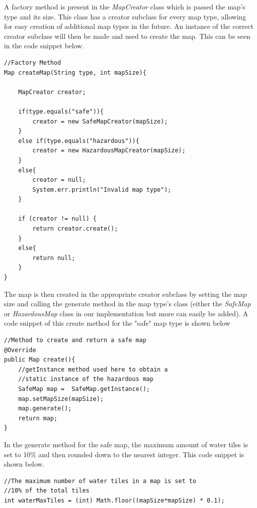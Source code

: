 \documentclass[a4paper,12pt]{extarticle}
\begin{document}
A factory method is present in the \textit{MapCreator} class which is passed the map's type and its size. This class has a creator subclass for every map type, allowing for easy creation of additional map types in the future. An instance of the correct creator subclass will then be made and used to create the map. This can be seen in the code snippet below.

\vspace{-1mm}
\begin{lstlisting}
//Factory Method
Map createMap(String type, int mapSize){

    MapCreator creator;

    if(type.equals("safe")){
        creator = new SafeMapCreator(mapSize);
    }
    else if(type.equals("hazardous")){
        creator = new HazardousMapCreator(mapSize);
    }
    else{
        creator = null;
        System.err.println("Invalid map type");
    }

    if (creator != null) {
        return creator.create();
    }
    else{
        return null;
    }
}
\end{lstlisting}
\vspace{4mm}

\noindent The map is then created in the appropriate creator subclass by setting the map size and calling the generate method in the map type's class (either the \textit{SafeMap} or \textit{HazardousMap} class in our implementation but more can easily be added). A code snippet of this create method for the "safe" map type is shown below

\vspace{-1mm}
\begin{lstlisting}
//Method to create and return a safe map
@Override
public Map create(){
    //getInstance method used here to obtain a 
    //static instance of the hazardous map
    SafeMap map =  SafeMap.getInstance();
    map.setMapSize(mapSize);
    map.generate();
    return map;
}
\end{lstlisting}

\noindent In the generate method for the safe map, the maximum amount of water tiles is set to 10\% and then rounded down to the nearest integer. This code snippet is shown below.

\begin{lstlisting}
//The maximum number of water tiles in a map is set to
//10% of the total tiles
int waterMaxTiles = (int) Math.floor((mapSize*mapSize) * 0.1);
\end{lstlisting}
\vspace{4mm}
\end{document}
